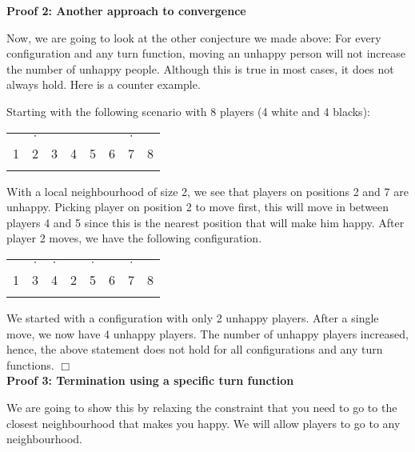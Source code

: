 \documentclass[../main.tex]{subfiles}
\begin{document}
\textbf{Proof 2: Another approach to convergence}

Now, we are going to look at the other conjecture we made above: For every configuration and any turn function, moving an unhappy person will not increase the number of unhappy people. Although this is true in most cases, it does not always hold. Here is a counter example.

Starting with the following scenario with 8 players (4 white and 4 blacks):

\begin{table}[H]
\begin{center}
{\begin{tabular}{| c |c| c| c| c |c| c |c|}
\hline
 & $\cdot$ &  & & &  & $\cdot$ & \\
 1 & 2 &3 &4 &5 &6  &7 &8 \\
\z &\x &\z &\x  &\z &\x &\z & \x \\
 \hline
\end{tabular}}
\end{center}
\end{table}

With a local neighbourhood of size 2, we see that players on positions 2 and 7 are unhappy. Picking player on position 2 to move first, this will move in between players 4 and 5 since this is the nearest position that will make him happy. After player 2 moves, we have the following configuration.


\begin{table}[H]
\begin{center}
{\begin{tabular}{| c |c| c| c| c |c| c |c|}
\hline
 & $\cdot$ & $\cdot$ & &$\cdot$ &  & $\cdot$ & \\
 1 & 3 &4 &2 &5 &6  &7 &8 \\
\z &\z &\x &\x  &\z &\x &\z & \x \\
 \hline
\end{tabular}}
\end{center}
\end{table}

We started with a configuration with only 2 unhappy players. After a single move, we now have 4 unhappy players. The number of unhappy players increased, hence, the above statement does not hold for all configurations and any turn functions. $ \Box $ \\


\textbf{Proof 3: Termination using a specific turn function}

We are going to show this by relaxing the constraint that you need to go to the closest neighbourhood that makes you happy. We will allow players to go to any neighbourhood.
\end{document}
